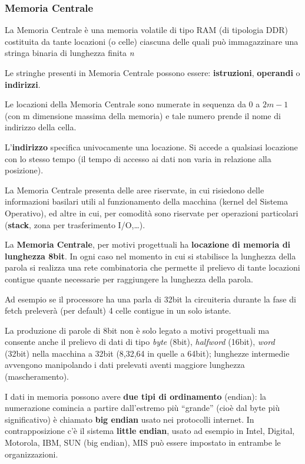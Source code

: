 \documentclass[12pt]{article}
\begin{document}
\subsubsection{Memoria Centrale}
La Memoria Centrale è una memoria volatile di tipo RAM (di tipologia DDR) costituita da tante locazioni (o celle) ciascuna delle quali può immagazzinare una stringa binaria di lunghezza finita \textit{n}\par\medskip\noindent
Le stringhe presenti in Memoria Centrale possono essere: \textbf{istruzioni}, \textbf{operandi} o \textbf{indirizzi}. \par\medskip\noindent
Le locazioni della Memoria Centrale sono numerate in sequenza da 0 a \(2m-1\) (con m dimensione massima della memoria) e tale numero prende il nome di indirizzo della cella.\par\medskip\noindent 
\par\medskip\noindent L’\textbf{indirizzo} specifica univocamente una locazione. Si accede a qualsiasi locazione con lo stesso tempo (il tempo di accesso ai dati non varia in relazione alla posizione).\par\medskip\noindent
La Memoria Centrale presenta delle aree riservate, in cui risiedono delle informazioni basilari utili al funzionamento della macchina (kernel del Sistema Operativo), ed altre in cui, per comodità sono riservate per operazioni particolari (\textbf{stack}, zona per trasferimento I/O,…).\par\medskip\noindent
La \textbf{Memoria Centrale}, per motivi progettuali ha \textbf{locazione di memoria di lunghezza 8bit}. In ogni caso nel momento in cui si stabilisce la lunghezza della parola si realizza una rete combinatoria che permette il prelievo di tante locazioni contigue quante necessarie per raggiungere la lunghezza della parola.\par\medskip\noindent
Ad esempio se il processore ha una parla di 32bit la circuiteria durante la fase di fetch preleverà (per default) 4 celle contigue in un solo istante.\par\medskip\noindent
La produzione di parole di 8bit non è solo legato a motivi progettuali ma consente anche il prelievo di dati di tipo \textit{byte} (8bit), \textit{halfword} (16bit), \textit{word} (32bit) nella macchina a 32bit (8,32,64 in quelle a 64bit); lunghezze intermedie avvengono manipolando i dati prelevati aventi maggiore lunghezza (mascheramento).\par\medskip\noindent
I dati in memoria possono avere \textbf{due tipi di ordinamento }(endian): la numerazione comincia a partire dall’estremo più “grande” (cioè dal byte più significativo) è chiamato \textbf{big endian} usato nei protocolli internet. In contrapposizione c’è il sistema \textbf{little endian}, usato ad esempio in Intel, Digital, Motorola, IBM, SUN (big endian), MIS può essere impostato in entrambe le organizzazioni.\par\medskip\noindent
\end{document}
